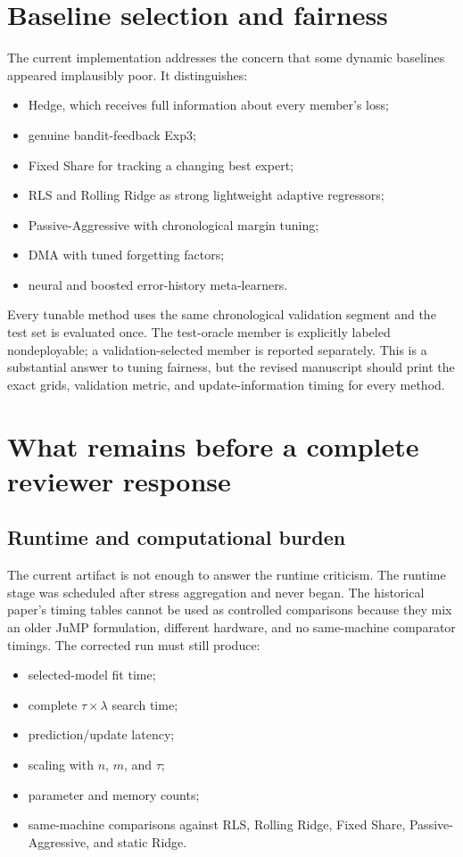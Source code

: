 \documentclass[10pt]{report}
\begin{document}
\chapter{Baseline selection and fairness}
The current implementation addresses the concern that some dynamic baselines appeared implausibly poor. It distinguishes:
\begin{itemize}
\item Hedge, which receives full information about every member's loss;
\item genuine bandit-feedback Exp3;
\item Fixed Share for tracking a changing best expert;
\item RLS and Rolling Ridge as strong lightweight adaptive regressors;
\item Passive-Aggressive with chronological margin tuning;
\item DMA with tuned forgetting factors;
\item neural and boosted error-history meta-learners.
\end{itemize}
Every tunable method uses the same chronological validation segment and the test set is evaluated once. The test-oracle member is explicitly labeled nondeployable; a validation-selected member is reported separately. This is a substantial answer to tuning fairness, but the revised manuscript should print the exact grids, validation metric, and update-information timing for every method.

\chapter{What remains before a complete reviewer response}
\section{Runtime and computational burden}
The current artifact is not enough to answer the runtime criticism. The runtime stage was scheduled after stress aggregation and never began. The historical paper's timing tables cannot be used as controlled comparisons because they mix an older JuMP formulation, different hardware, and no same-machine comparator timings. The corrected run must still produce:
\begin{itemize}
\item selected-model fit time;
\item complete $\tau\times\lambda$ search time;
\item prediction/update latency;
\item scaling with $n$, $m$, and $\tau$;
\item parameter and memory counts;
\item same-machine comparisons against RLS, Rolling Ridge, Fixed Share, Passive-Aggressive, and static Ridge.
\end{itemize}
\end{document}
